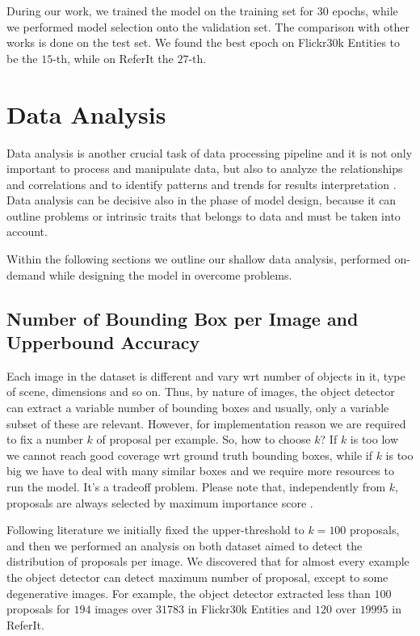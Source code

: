 During our work, we trained the model on the training set for $30$
epochs, while we performed model selection onto the validation set.
The comparison with other works is done on the test set. We found the
best epoch on Flickr30k Entities to be the $15$-th, while on ReferIt
the $27$-th. 

\section{Data Analysis}
\label{sec:data-analysis}

Data analysis is another crucial task of data processing pipeline and
it is not only important to process and manipulate data, but also to
analyze the relationships and correlations and to identify patterns
and trends for results interpretation \cite{sharma2020understanding}.
Data analysis can be decisive also in the phase of model design,
because it can outline problems or intrinsic traits that belongs to
data and must be taken into account.

Within the following sections we outline our shallow data analysis,
performed on-demand while designing the model in overcome problems.

\subsection{Number of Bounding Box per Image and Upperbound Accuracy}
\label{subsec:num-of-proposals}

Each image in the dataset is different and vary wrt number of objects
in it, type of scene, dimensions and so on. Thus, by nature of images,
the object detector can extract a variable number of bounding boxes
and usually, only a variable subset of these are relevant. However,
for implementation reason we are required to fix a number $k$ of
proposal per example. So, how to choose $k$? If $k$ is too low we
cannot reach good coverage wrt ground truth bounding boxes, while if
$k$ is too big we have to deal with many similar boxes and we require
more resources to run the model. It's a tradeoff problem. Please note
that, independently from $k$, proposals are always selected by maximum
importance score \cite{ren2015faster}.

Following literature we initially fixed the upper-threshold to $k =
100$ proposals, and then we performed an analysis on both dataset
aimed to detect the distribution of proposals per image. We discovered
that for almost every example the object detector can detect maximum
number of proposal, except to some degenerative images. For example,
the object detector extracted less than $100$ proposals for $194$
images over $31783$ in Flickr30k Entities and $120$ over $19995$ in
ReferIt.

